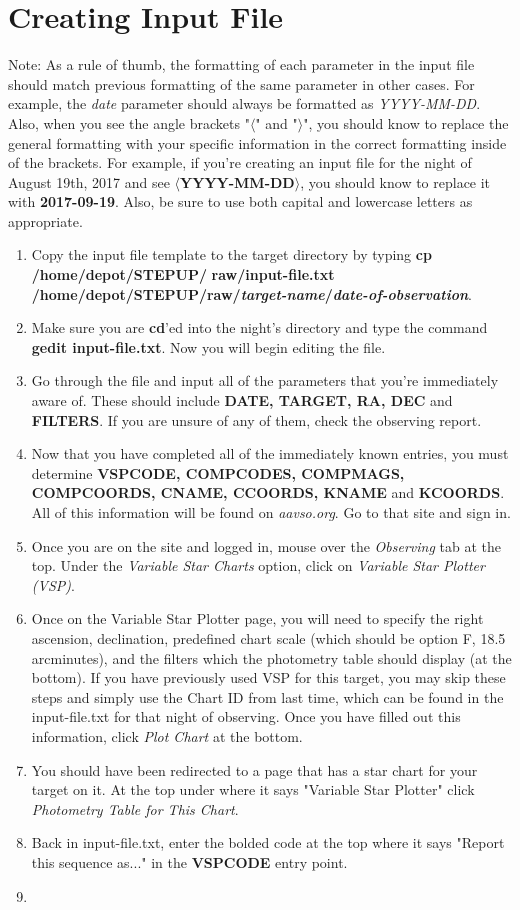 \documentclass[11pt]{report}
\begin{document}
\section{Creating Input File}
Note: As a rule of thumb, the formatting of each parameter in the input file should match previous formatting of the same parameter in other cases. For example, the \emph{date} parameter should always be formatted as \emph{YYYY-MM-DD}. Also, when you see the angle brackets "$\langle$" and "$\rangle$", you should know to replace the general formatting with your specific information in the correct formatting inside of the brackets. For example, if you're creating an input file for the night of August 19th, 2017 and see {\bf $\langle$YYYY-MM-DD$\rangle$}, you should know to replace it with {\bf 2017-09-19}. Also, be sure to use both capital and lowercase letters as appropriate.
\begin{enumerate}
\item Copy the input file template to the target directory by typing {\bf cp /home/depot/STEPUP/} {\bf raw/input-file.txt /home/depot/STEPUP/raw/\emph{target-name}/\emph{date-of-observation}}. 
\item Make sure you are {\bf cd}'ed into the night's directory and type the command {\bf gedit input-file.txt}. Now you will begin editing the file.
\item Go through the file and input all of the parameters that you're immediately aware of. These should include {\bf DATE, TARGET, RA, DEC} and {\bf FILTERS}. If you are unsure of any of them, check the observing report.
\item Now that you have completed all of the immediately known entries, you must determine {\bf VSPCODE, COMPCODES, COMPMAGS, COMPCOORDS, CNAME, CCOORDS, KNAME} and {\bf KCOORDS}. All of this information will be found on \emph{aavso.org}. Go to that site and sign in. 
\item Once you are on the site and logged in, mouse over the \emph{Observing} tab at the top. Under the \emph{Variable Star Charts} option, click on \emph{Variable Star Plotter (VSP)}. 
\item Once on the Variable Star Plotter page, you will need to specify the right ascension, declination, predefined chart scale (which should be option F, 18.5 arcminutes), and the filters which the photometry table should display (at the bottom). If you have previously used VSP for this target, you may skip these steps and simply use the Chart ID from last time, which can be found in the input-file.txt for that night of observing. Once you have filled out this information, click \emph{Plot Chart} at the bottom. 
\item You should have been redirected to a page that has a star chart for your target on it. At the top under where it says "Variable Star Plotter" click \emph{Photometry Table for This Chart}.
\item Back in input-file.txt, enter the bolded code at the top where it says "Report this sequence as..." in the {\bf VSPCODE} entry point.
\item 
\end{enumerate}

\end{document}
